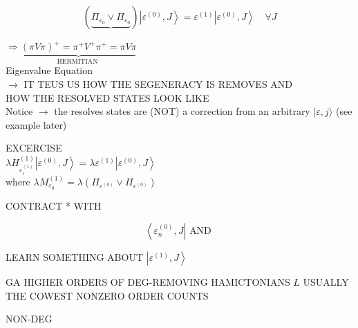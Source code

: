 \documentclass[10pt]{article}
\begin{document}
$$
(\underbrace{\Pi_{\varepsilon_{0}} \vee \Pi_{\varepsilon_{0}}})\left|\varepsilon^{(0)}, J\right\rangle=\varepsilon^{(1)}\left|\varepsilon^{(0)}, J\right\rangle \quad \forall J
$$

$\Rightarrow \underbrace{(\pi V \pi)^{+}=\pi^{+} V^{+} \pi^{+}=\pi V \pi}_{\text {HERMITIAN }}$\\
Eigenvalue Equation\\
$\rightarrow$ IT TEUS US HOW THE SEGENERACY IS REMOVES AND\\
HOW THE RESOLVED STATES LOOK LIKE\\
Notice $\rightarrow$ the resolves states are (NOT) a correction from an arbitrary $|\varepsilon, j\rangle$ (see example later)

EXCERCISE\\
$\lambda H_{\varepsilon_{i}^{(1)}}^{(1)}\left|\varepsilon^{(0)}, J\right\rangle=\lambda \varepsilon^{(1)}\left|\varepsilon^{(0)}, J\right\rangle$\\
where $\lambda M_{\varepsilon_{0}}^{(1)}=\lambda\left(\Pi_{\varepsilon^{(0)}} \vee \Pi_{\varepsilon^{(0)}}\right)$

CONTRACT * WITH

$$
\left\langle\varepsilon_{n}^{(0)}, J\right| \text { AND }
$$

LEARN SOMETHING ABOUT $\left|\varepsilon^{(1)}, J\right\rangle$

GA HIGHER ORDERS OF DEG-REMOVING HAMICTONIANS $L$ USUALLY THE COWEST NONZERO ORDER COUNTS

NON-DEG
\end{document}

